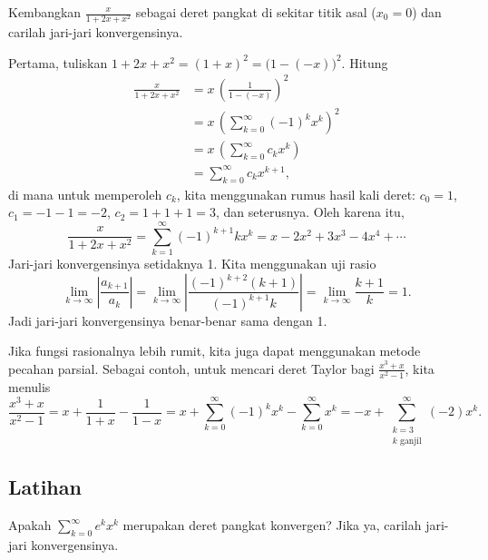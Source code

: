 \begin{example}
Kembangkan $\frac{x}{1+2x+x^2}$ sebagai deret pangkat di sekitar titik asal ($x_0 = 0$) dan
carilah jari-jari konvergensinya.

Pertama, tuliskan $1+2x+x^2 = {(1+x)}^2 = {\bigl(1-(-x)\bigr)}^2$.
Hitung
\begin{equation*}
\begin{split}
\frac{x}{1+2x+x^2}
&=
x \,
{\left(
\frac{1}{1-(-x)}
\right)}^2
\\
&=
x \,
{ \left( 
\sum_{k=0}^\infty {(-1)}^k x^k 
\right)}^2
\\
&=
x \,
\left(
\sum_{k=0}^\infty c_k x^k 
\right)
\\
&=
\sum_{k=0}^\infty c_k x^{k+1} ,
\end{split}
\end{equation*}
di mana untuk memperoleh $c_k$, kita menggunakan rumus hasil kali deret:
$c_0 = 1$, $c_1 = -1 -1 = -2$, $c_2 = 1+1+1 = 3$, dan seterusnya.
Oleh karena itu,
\begin{equation*}
\frac{x}{1+2x+x^2}
=
\sum_{k=1}^\infty {(-1)}^{k+1} k x^k
= x-2x^2+3x^3-4x^4+\cdots
\end{equation*}
Jari-jari konvergensinya setidaknya 1. Kita menggunakan uji rasio
\begin{equation*}
\lim_{k\to\infty}
\left\lvert \frac{a_{k+1}}{a_k} \right\rvert
=
\lim_{k\to\infty}
\left\lvert \frac{{(-1)}^{k+2} (k+1)}{{(-1)}^{k+1}k} \right\rvert
=
\lim_{k\to\infty}
\frac{k+1}{k}
= 1 .
\end{equation*}
Jadi jari-jari konvergensinya benar-benar sama dengan 1.
\end{example}

Jika fungsi rasionalnya lebih rumit, kita juga dapat
menggunakan metode pecahan parsial. Sebagai contoh,
untuk mencari deret Taylor bagi $\frac{x^3+x}{x^2-1}$, kita menulis
\begin{equation*}
\frac{x^3+x}{x^2-1}
=
x + \frac{1}{1+x} - \frac{1}{1-x}
=
x + \sum_{k=0}^\infty {(-1)}^k x^k - \sum_{k=0}^\infty x^k
=
- x + \sum_{\substack{k=3 \\ k \text{ ganjil}}}^\infty (-2) x^k .
\end{equation*}

\subsection{Latihan}

\begin{exercise}
Apakah $\displaystyle \sum_{k=0}^\infty e^k x^k$ merupakan deret pangkat konvergen?
Jika ya, carilah jari-jari konvergensinya.
\end{exercise}


